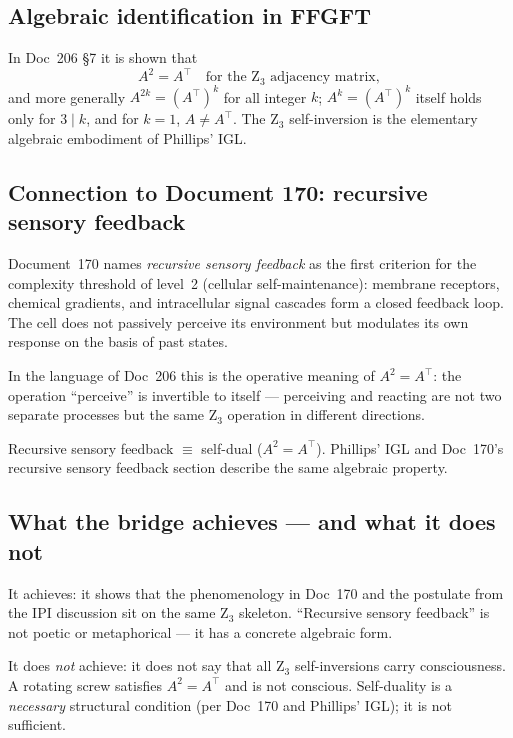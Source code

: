 \subsection{Algebraic identification in FFGFT}

In Doc~206 \S7 it is shown that
\begin{equation}
A^2 = A^\top \quad \text{for the Z}_3 \text{ adjacency matrix},
\end{equation}
and more generally $A^{2k} = (A^\top)^k$ for all integer $k$; $A^k = (A^\top)^k$ itself holds only for $3 \mid k$, and for $k = 1$, $A \neq A^\top$. The Z$_3$ self-inversion is the elementary algebraic embodiment of Phillips' IGL.

\subsection{Connection to Document 170: recursive sensory feedback}

Document~170 names \emph{recursive sensory feedback} as the first criterion for the complexity threshold of level~2 (cellular self-maintenance): membrane receptors, chemical gradients, and intracellular signal cascades form a closed feedback loop. The cell does not passively perceive its environment but modulates its own response on the basis of past states.

In the language of Doc~206 this is the operative meaning of $A^2 = A^\top$: the operation ``perceive'' is invertible to itself --- perceiving and reacting are not two separate processes but the same Z$_3$ operation in different directions.

\begin{insightBox}
Recursive sensory feedback $\equiv$ self-dual ($A^2 = A^\top$). Phillips' IGL and Doc~170's recursive sensory feedback section describe the same algebraic property.
\end{insightBox}

\subsection{What the bridge achieves --- and what it does not}

It achieves: it shows that the phenomenology in Doc~170 and the postulate from the IPI discussion sit on the same Z$_3$ skeleton. ``Recursive sensory feedback'' is not poetic or metaphorical --- it has a concrete algebraic form.

It does \emph{not} achieve: it does not say that all Z$_3$ self-inversions carry consciousness. A rotating screw satisfies $A^2 = A^\top$ and is not conscious. Self-duality is a \emph{necessary} structural condition (per Doc~170 and Phillips' IGL); it is not sufficient.

